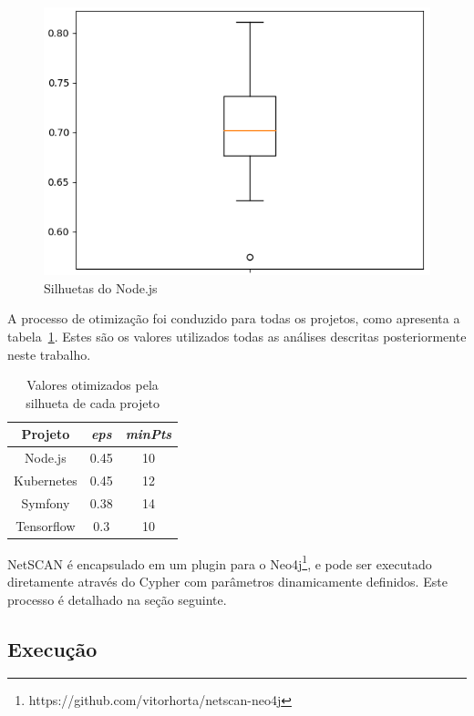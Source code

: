 \documentclass[12pt,openany,oneside,a4paper,english,brazil]{abntbibufjf}
\begin{document}
  \begin{figure}[tbp]
  \centerline{\includegraphics[width=.8\linewidth]{silhouette_boxplot}}
  \caption{Silhuetas do Node.js}
  \label{fig:silhouette_boxplot}
  \end{figure}

  A processo de otimização foi conduzido para todas os projetos, como apresenta a tabela~\ref{tab:netscan_optimize}. Estes são os valores utilizados todas as análises descritas posteriormente neste trabalho.
  \begin{table}[htbp]
  \caption{Valores otimizados pela silhueta de cada projeto}
  \begin{center}
  \begin{tabular}{|c|c|c|}
  \hline
  \textbf{Projeto} & \textbf{\textit{eps}} & \textbf{\textit{minPts}} \\
  \hline
    Node.js    & 0.45 & 10     \\
    Kubernetes & 0.45 & 12     \\
    Symfony    & 0.38 & 14     \\
    Tensorflow & 0.3  & 10    \\
  \hline
  \end{tabular}
  \label{tab:netscan_optimize}
  \end{center}
  \end{table}

  NetSCAN é encapsulado em um plugin para o Neo4j\footnote{https://github.com/vitorhorta/netscan-neo4j}, e pode ser executado diretamente através do Cypher com parâmetros dinamicamente definidos. Este processo é detalhado na seção seguinte.

  \subsection{Execução}
\end{document}
